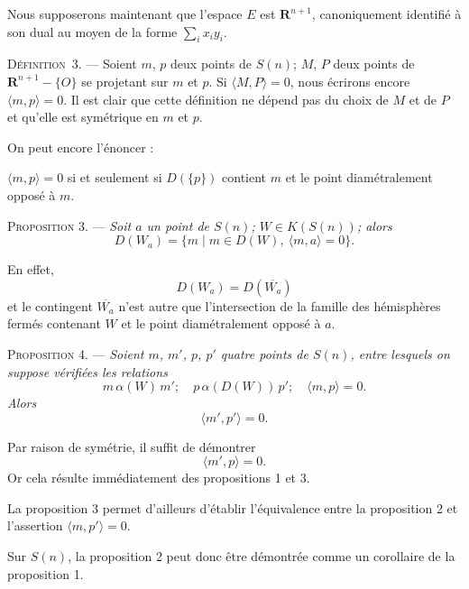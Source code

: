 \documentclass[11pt]{article}
\newcommand{\R}{\boldsymbol{R}}
\newcommand{\bzcf}[2]{#1}
\newcommand{\bznum}[1]{\if\relax\detokenize{#1}\relax\else\ #1\fi}
\newenvironment{defin}[1][]{\par\medskip\noindent\textsc{Définition\bznum{#1}.} --- }{\par\medskip}
\newenvironment{prop}[1][]{\par\medskip\noindent\textsc{Proposition #1.} --- \itshape}{\par\medskip}
\newenvironment{proof}[1][]{\par}{\par}
\begin{document}
Nous supposerons maintenant que l'espace $E$ est $\R^{n+1}$, canoniquement identifié à son dual au
moyen de la forme $\sum_i x_iy_i$.

\begin{defin}[3]
Soient $m$, $p$ deux points de $S(n)$; $M$, $P$ deux points de $\R^{n+1}-\{O\}$ se projetant sur
$m$ et $p$. Si $\langle M, P\rangle=0$, nous écrirons encore $\langle m, p\rangle=0$. Il est clair
que cette définition ne dépend pas du choix de $M$ et de $P$ et qu'elle est symétrique en $m$ et
$p$.

On peut encore l'énoncer :

$\langle m, p\rangle=0$ si et seulement si $D(\{p\})$ contient $m$ et le point diamétralement
opposé à $m$.
\end{defin}

\begin{prop}[3]
Soit $a$ un point de $S(n)$; $W\in K(S(n))$; alors
\[ D(W_a)=\{m\mid m\in D(W),\ \langle m, a\rangle=0\}. \]
\end{prop}

\begin{proof}
En effet,
\[ D(W_a)=D(\overline{W_a}) \]
et le contingent $\overline{W_a}$ n'est autre que l'intersection de la famille des hémisphères
fermés contenant $W$ et le point diamétralement opposé à $a$.
\end{proof}

\begin{prop}[4]
Soient $m$, $m'$, $p$, $p'$ quatre points de $S(n)$, entre lesquels on suppose vérifiées les
relations
\[ m\,\alpha(W)\,m';\quad p\,\alpha(D(W))\,p';\quad\langle m, p\rangle=0. \]
Alors
\[ \langle m', p'\rangle=0. \]
\end{prop}

\begin{proof}
Par raison de symétrie, il suffit de démontrer
\[ \langle m', p\rangle=0. \]
Or cela résulte immédiatement des \bzcf{propositions 1}{\ref{bzprop:c3s4p1_alpha_cone_appui}} et
\bzcf{3}{\ref{bzprop:c3s4p3_dual_cone_appui}}.
\end{proof}

\bzcf{La proposition 3}{\ref{bzprop:c3s4p3_dual_cone_appui}} permet d'ailleurs d'établir
l'équivalence entre \bzcf{la proposition 2}{\ref{bzprop:c3s4p2_dual_cone_appui_sature}} et
l'assertion $\langle m, p'\rangle=0$.

Sur $S(n)$, \bzcf{la proposition 2}{\ref{bzprop:c3s4p2_dual_cone_appui_sature}} peut donc être
démontrée comme un corollaire de \bzcf{la proposition 1}{\ref{bzprop:c3s4p1_alpha_cone_appui}}.
\end{document}
